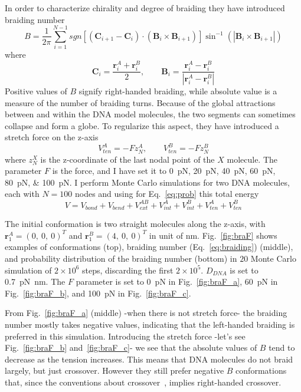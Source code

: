 \documentclass[a4paper,10pt]{article}
\begin{document}
In order to characterize chirality and degree of braiding they have introduced braiding number
\begin{equation}\label{eq:braiding}
B=\dfrac{1}{2\pi}\sum_{i=1}^{N-1}sgn\left [\left (\textbf{C}_{i+1}-\textbf{C}_{i}\right )\cdot\left (\textbf{B}_{i}\times\textbf{B}_{i+1}\right )\right ]\sin^{-1}\left (\left |\textbf{B}_{i}\times\textbf{B}_{i+1}\right |\right )
\end{equation}
where
\begin{equation}
\textbf{C}_{i}=\dfrac{\textbf{r}_{i}^{A}+\textbf{r}_{i}^{B}}{2},\qquad \textbf{B}_{i}=\dfrac{\textbf{r}_{i}^{A}-\textbf{r}_{i}^{B}}{\left |\textbf{r}_{i}^{A}-\textbf{r}_{i}^{B}\right |}
\end{equation}
Positive values of $B$ signify right-handed braiding, while absolute value is a measure of the number of braiding turns.
Because of the global attractions between and within the DNA model molecules, the two segments can sometimes collapse and form a globe.
To regularize this aspect, they have introduced a stretch force on the z-axis
\begin{equation}\label{eq:ten}
V_{ten}^{A}=-Fz_{N}^{A},\qquad V_{ten}^{B}=-Fz_{N}^{B}
\end{equation}
where $z_{N}^{X}$ is the z-coordinate of the last nodal point of the $X$ molecule.
The parameter $F$ is the force, and I have set it to \SIlist{0; 20; 40; 60; 80; 100}{\pico\newton}.
I perform Monte Carlo simulations for two DNA molecules, each with $N=100$ nodes and using for Eq.~\ref{eq:prob} this total energy
\begin{equation}\label{eq:bra_energy}
V=V_{bond}+V_{bend}+V_{ext}^{AB}+V_{int}^{A}+V_{int}^{B}+V_{ten}^{A}+V_{ten}^{B}
\end{equation}

The initial conformation is two straight molecules along the z-axis, with $\textbf{r}_{1}^{A}=\left (0,\ 0,\ 0\right )^T$ and $\textbf{r}_{1}^{B}=\left (4,\ 0,\ 0\right )^T$ in unit of \si{\nm}.
Fig.~\ref{fig:braF} shows examples of conformations (top), braiding number (Eq.~\ref{eq:braiding}) (middle), and probability distribution of the braiding number (bottom) in $20$ Monte Carlo simulation of $2\times 10^6$ steps, discarding the first $2\times 10^5$.
$D_{DNA}$ is set to \SI{0.7}{\pico\newton\nano\meter}.
The $F$ parameter is set to \SI{0}{\pico\newton} in Fig.~\ref{fig:braF_a}, \SI{60}{\pico\newton} in Fig.~\ref{fig:braF_b}, and \SI{100}{\pico\newton} in Fig.~\ref{fig:braF_c}.

From Fig.~\ref{fig:braF_a} (middle) -when there is not stretch force- the braiding number mostly takes negative values, indicating that the left-handed braiding is preferred in this simulation.
Introducing the stretch force -let's see Fig.~\ref{fig:braF_b} and~\ref{fig:braF_c}- we see that the absolute values of $B$ tend to decrease as the tension increases.
This means that DNA molecules do not braid largely, but just crossover.
However they still prefer negative $B$ conformations that, since the conventions about crossover~\cite{br_1}, implies right-handed crossover.
\end{document}
